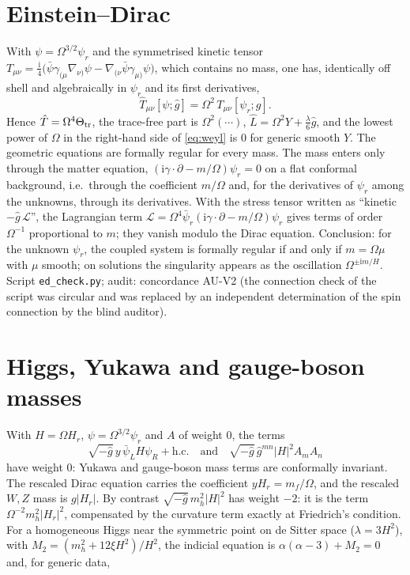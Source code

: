 \documentclass[11pt,a4paper]{article}
\newcommand{\ii}{\mathrm{i}}
\begin{document}
\section{Einstein--Dirac}
\label{sec:ed}
With $\psi=\Omega^{3/2}\psi_{r}$ and the symmetrised kinetic tensor $T_{\mu\nu}=\tfrac{\ii}{4}\big(\bar\psi\gamma_{(\mu}\nabla_{\nu)}\psi-\nabla_{(\nu}\bar\psi\gamma_{\mu)}\psi\big)$, which contains no mass, one has, identically off shell and algebraically in $\psi_{r}$ and its first derivatives,
\begin{equation}
\hat T_{\mu\nu}[\psi;\hat g]=\Omega^{2}\,T_{\mu\nu}[\psi_{r};g].
\end{equation}
Hence $\hat T=\Omega^{4}\Theta_{\rm tr}$, the trace-free part is $\Omega^{2}(\cdots)$, $\hat L=\Omega^{2}Y+\tfrac{\lambda}{6}\hat g$, and the lowest power of $\Omega$ in the right-hand side of \eqref{eq:weyl} is $0$ for generic smooth $Y$. The geometric equations are formally regular for every mass. The mass enters only through the matter equation, $(\ii\gamma\cdot\partial-m/\Omega)\psi_{r}=0$ on a flat conformal background, i.e.\ through the coefficient $m/\Omega$ and, for the derivatives of $\psi_{r}$ among the unknowns, through its derivatives. With the stress tensor written as ``kinetic $-\hat g\,\mathcal{L}$'', the Lagrangian term $\mathcal{L}=\Omega^{4}\bar\psi_{r}(\ii\gamma\cdot\partial-m/\Omega)\psi_{r}$ gives terms of order $\Omega^{-1}$ proportional to $m$; they vanish modulo the Dirac equation. Conclusion: for the unknown $\psi_{r}$, the coupled system is formally regular if and only if $m=\Omega\mu$ with $\mu$ smooth; on solutions the singularity appears as the oscillation $\Omega^{\pm\ii m/H}$. Script \texttt{ed\_check.py}; audit: concordance AU-V2 (the connection check of the script was circular and was replaced by an independent determination of the spin connection by the blind auditor).

\section{Higgs, Yukawa and gauge-boson masses}
\label{sec:hx}
With $H=\Omega H_{r}$, $\psi=\Omega^{3/2}\psi_{r}$ and $A$ of weight $0$, the terms
\[\sqrt{-\hat g}\,y\,\bar\psi_{L}H\psi_{R}+\text{h.c.}\quad\text{and}\quad\sqrt{-\hat g}\,\hat g^{mn}|H|^{2}A_{m}A_{n}\]
have weight $0$: Yukawa and gauge-boson mass terms are conformally invariant. The rescaled Dirac equation carries the coefficient $y H_{r}=m_{f}/\Omega$, and the rescaled $W,Z$ mass is $g|H_{r}|$. By contrast $\sqrt{-\hat g}\,m_{h}^{2}|H|^{2}$ has weight $-2$: it is the term $\Omega^{-2}m_{h}^{2}|H_{r}|^{2}$, compensated by the curvature term exactly at Friedrich's condition. For a homogeneous Higgs near the symmetric point on de Sitter space ($\lambda=3H^{2}$), with $M_{2}=(m_{h}^{2}+12\xi H^{2})/H^{2}$, the indicial equation is $\alpha(\alpha-3)+M_{2}=0$ and, for generic data,
\end{document}
